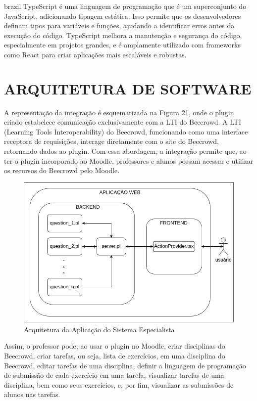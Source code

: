\begin{otherlanguage*}{brazil}
TypeScript é uma linguagem de programação que é um superconjunto do JavaScript, adicionando tipagem estática. Isso permite que os desenvolvedores definam tipos para variáveis e funções, ajudando a identificar erros antes da execução do código. TypeScript melhora a manutenção e segurança do código, especialmente em projetos grandes, e é amplamente utilizado com frameworks como React para criar aplicações mais escaláveis e robustas.

\section{ARQUITETURA DE SOFTWARE}

A representação da integração é esquematizada na Figura 21, onde o plugin criado estabelece comunicação exclusivamente com a LTI do Beecrowd. A LTI (Learning Tools Interoperability) do Beecrowd, funcionando como uma interface receptora de requisições, interage diretamente com o site do Beecrowd, retornando dados ao plugin. Com essa abordagem, a integração permite que, ao ter o plugin incorporado ao Moodle, professores e alunos possam acessar e utilizar os recursos do Beecrowd pelo Moodle.

\begin{figure}[h!]
    \centering
            \caption{Arquitetura da Aplicação do Sistema Especialista}
            \label{fig:ModeloConceitual}
        \includegraphics[scale=0.6]{pictures/arquitetura.png}
\end{figure}

Assim, o professor pode, ao usar o plugin no Moodle, criar disciplinas do Beecrowd, criar tarefas, ou seja, lista de exercícios, em uma disciplina do Beecrowd, editar tarefas de uma disciplina, definir a linguagem de programação de submissão de cada exercício em uma tarefa, visualizar tarefas de uma disciplina, bem como seus exercícios, e, por fim, visualizar as submissões de alunos nas tarefas. 


\end{otherlanguage*}
